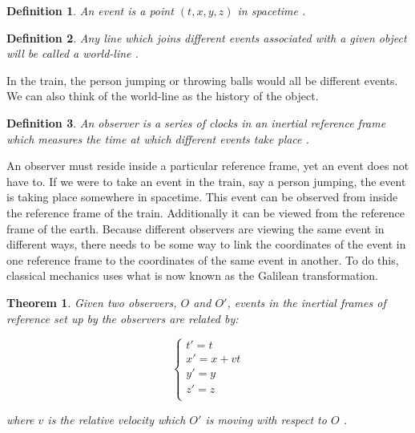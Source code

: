\documentclass[12pt]{article}
\newtheorem{thm}{Theorem}
\theoremstyle{defn}
\newtheorem{defn}{Definition}
\theoremstyle{pf}
\newcommand{\0}{\emptyset}
\renewcommand{\-}{\setminus}
\begin{document}
\begin{defn}An \textit{event} is a point $(t,x,y,z)$ in spacetime \cite{callahan}.
\end{defn}

\begin{defn}Any line which joins different events associated with a given object will be called a \textit{world-line}  \cite{shadowitz}.
\end{defn}

In the train, the person jumping or throwing balls would all be different events. We can also think of the world-line as the history of the object.


\begin{defn}An \textit{observer} is a series of clocks in an inertial reference frame which measures the time at which different events take place \cite{taylor_wheeler}.
\end{defn}

An observer must reside inside a particular reference frame, yet an event does not have to. If we were to take an event in the train, say a person jumping, the event is taking place somewhere in spacetime. This event can be observed from inside the reference frame of the train. Additionally it can be viewed from the reference frame of the earth. Because different observers are viewing the same event in different ways, there needs to be some way to link the coordinates of the event in one reference frame to the coordinates of the same event in another. To do this, classical mechanics uses what is now known as the Galilean transformation.

\begin{thm}\label{gal_trans}Given two observers, $O$ and $O'$, events in the inertial frames of reference set up by the observers are related by:

$$\begin{cases}
t'=t\\
x'=x+vt\\
y'=y\\
z'=z\\
\end{cases}
$$

where $v$ is the relative velocity which $O'$ is moving with respect to $O$ \cite{shadowitz}.
\end{thm}
\end{document}
